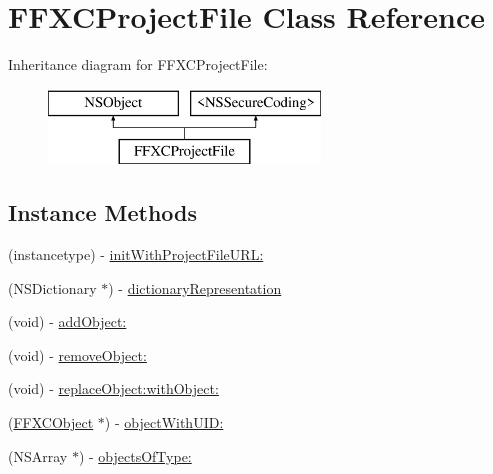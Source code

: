 \hypertarget{interface_f_f_x_c_project_file}{\section{F\-F\-X\-C\-Project\-File Class Reference}
\label{interface_f_f_x_c_project_file}
}
Inheritance diagram for F\-F\-X\-C\-Project\-File\-:\begin{figure}[H]
\begin{center}
\leavevmode
\includegraphics[height=2.000000cm]{interface_f_f_x_c_project_file}
\end{center}
\end{figure}
\subsection*{Instance Methods}
\begin{DoxyCompactItemize}
\item 
(instancetype) -\/ \hyperlink{interface_f_f_x_c_project_file_abf3652d05489dd9c4ab4668de455c930}{init\-With\-Project\-File\-U\-R\-L\-:}
\item 
(N\-S\-Dictionary $\ast$) -\/ \hyperlink{interface_f_f_x_c_project_file_aee5c7ce67139a69d2e2b0c840f541513}{dictionary\-Representation}
\item 
(void) -\/ \hyperlink{interface_f_f_x_c_project_file_a40c393723bfc2ad74378e19af034b18c}{add\-Object\-:}
\item 
(void) -\/ \hyperlink{interface_f_f_x_c_project_file_a1402332506ddd01bcb9fbfa0fab484f4}{remove\-Object\-:}
\item 
(void) -\/ \hyperlink{interface_f_f_x_c_project_file_a14e5b126a4f713f29c4c1449d4c63e01}{replace\-Object\-:with\-Object\-:}
\item 
(\hyperlink{interface_f_f_x_c_object}{F\-F\-X\-C\-Object} $\ast$) -\/ \hyperlink{interface_f_f_x_c_project_file_aec605cfbd30920d1b829cb1a5f645441}{object\-With\-U\-I\-D\-:}
\item 
(N\-S\-Array $\ast$) -\/ \hyperlink{interface_f_f_x_c_project_file_af770163bd6a175c385efbfac3e5595e8}{objects\-Of\-Type\-:}
\end{DoxyCompactItemize}
